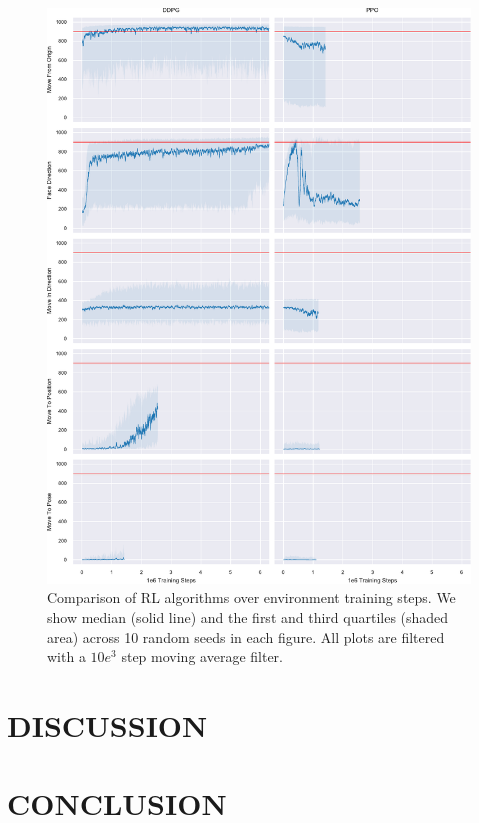\documentclass[letterpaper, 10 pt, conference]{ieeeconf}
\begin{document}
\begin{figure}[p]
    
    \centering
    \includegraphics[width=\textwidth]{fig-rl-perf}
    
    \captionsetup{margin=10pt}
    \caption{
        Comparison of RL algorithms over environment training steps.
        We show median (solid line) and the first and third quartiles (shaded area) across 10 random seeds in each figure.
        All plots are filtered with a $10e^3$ step moving average filter.
    }
    
    \label{fig:rl-perf}
\end{figure}

\section{DISCUSSION}

\lipsum[1]

\section{CONCLUSION}
\end{document}
